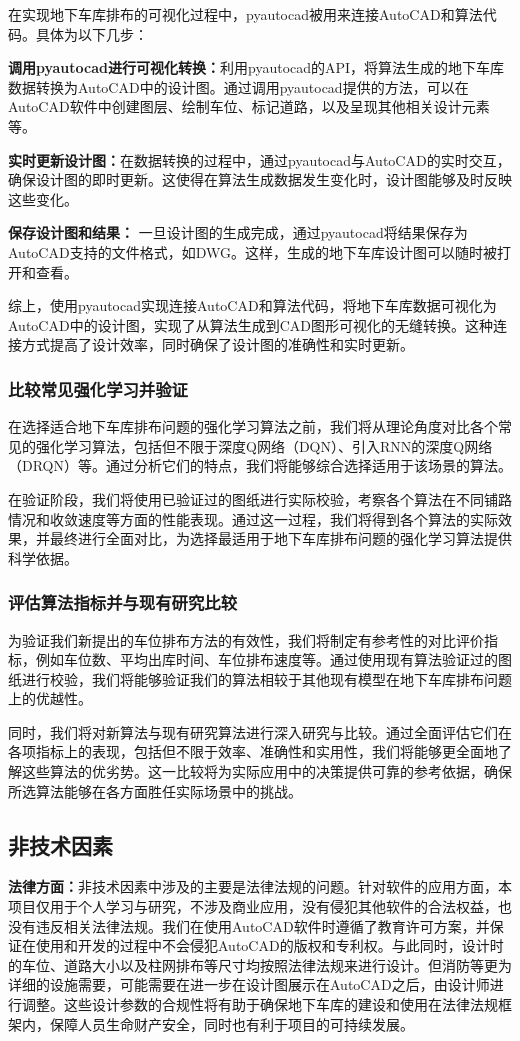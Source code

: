 在实现地下车库排布的可视化过程中，pyautocad被用来连接AutoCAD和算法代码。具体为以下几步：

{\bfseries 调用pyautocad进行可视化转换：}利用pyautocad的API，将算法生成的地下车库数据转换为AutoCAD中的设计图。通过调用pyautocad提供的方法，可以在AutoCAD软件中创建图层、绘制车位、标记道路，以及呈现其他相关设计元素等。

{\bfseries 实时更新设计图：}在数据转换的过程中，通过pyautocad与AutoCAD的实时交互，确保设计图的即时更新。这使得在算法生成数据发生变化时，设计图能够及时反映这些变化。

{\bfseries 保存设计图和结果：} 一旦设计图的生成完成，通过pyautocad将结果保存为AutoCAD支持的文件格式，如DWG。这样，生成的地下车库设计图可以随时被打开和查看。

综上，使用pyautocad实现连接AutoCAD和算法代码，将地下车库数据可视化为AutoCAD中的设计图，实现了从算法生成到CAD图形可视化的无缝转换。这种连接方式提高了设计效率，同时确保了设计图的准确性和实时更新。
\subsubsection{比较常见强化学习并验证}
在选择适合地下车库排布问题的强化学习算法之前，我们将从理论角度对比各个常见的强化学习算法，包括但不限于深度Q网络（DQN）、引入RNN的深度Q网络（DRQN）等。通过分析它们的特点，我们将能够综合选择适用于该场景的算法。

在验证阶段，我们将使用已验证过的图纸进行实际校验，考察各个算法在不同铺路情况和收敛速度等方面的性能表现。通过这一过程，我们将得到各个算法的实际效果，并最终进行全面对比，为选择最适用于地下车库排布问题的强化学习算法提供科学依据。
\subsubsection{评估算法指标并与现有研究比较}
为验证我们新提出的车位排布方法的有效性，我们将制定有参考性的对比评价指标，例如车位数、平均出库时间、车位排布速度等。通过使用现有算法验证过的图纸进行校验，我们将能够验证我们的算法相较于其他现有模型在地下车库排布问题上的优越性。

同时，我们将对新算法与现有研究算法进行深入研究与比较。通过全面评估它们在各项指标上的表现，包括但不限于效率、准确性和实用性，我们将能够更全面地了解这些算法的优劣势。这一比较将为实际应用中的决策提供可靠的参考依据，确保所选算法能够在各方面胜任实际场景中的挑战。
\subsection{非技术因素}
{\bfseries 法律方面：}非技术因素中涉及的主要是法律法规的问题。针对软件的应用方面，本项目仅用于个人学习与研究，不涉及商业应用，没有侵犯其他软件的合法权益，也没有违反相关法律法规。我们在使用AutoCAD软件\cite{JCJG202304039}时遵循了教育许可方案，并保证在使用和开发的过程中不会侵犯AutoCAD的版权和专利权。与此同时，设计时的车位、道路大小以及柱网排布等尺寸均按照法律法规来进行设计。但消防等更为详细的设施需要，可能需要在进一步在设计图展示在AutoCAD之后，由设计师进行调整。这些设计参数的合规性将有助于确保地下车库的建设和使用在法律法规框架内，保障人员生命财产安全，同时也有利于项目的可持续发展。


